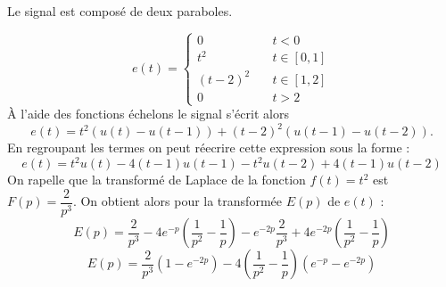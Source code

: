 Le signal est composé de deux paraboles. 
\begin{figure}[!h]
    \centering
    
\end{figure}
\[
e(t)=
\begin{cases}
    0&\quad t<0\\
    t^2&\quad t\in[0,1]\\
    (t-2)^2&\quad t\in[1,2]\\
    0&\quad t>2
\end{cases}
\]
\`A l'aide des fonctions échelons le signal s'écrit alors 
\[
    e(t)=t^2\left(u(t)-u(t-1)\right)+(t-2)^2\left(u(t-1)-u(t-2)\right).
\]
En regroupant les termes on peut réecrire cette expression sous la forme :
\[
    e(t)=t^2u(t)-4(t-1)u(t-1)-t^2u(t-2)+4(t-1)u(t-2)
\]
On rapelle que la transformé de Laplace de la fonction $f(t)=t^2$ 
est $F(p)=\dfrac{2}{p^3}$. On obtient alors pour la transformée 
$E(p)$ de $e(t)$ :
\[
    E(p)=\dfrac{2}{p^3}-4e^{-p}\left(\dfrac{1}{p^2}-\dfrac{1}{p}\right)
        -e^{-2p}\dfrac{2}{p^3}+4e^{-2p}\left(\dfrac{1}{p^2}-\dfrac{1}{p}\right)
\]
\[
    E(p)=\dfrac{2}{p^3}\left(1-e^{-2p}\right)
        -4\left(\dfrac{1}{p^2}-\dfrac{1}{p}\right)\left(e^{-p}-e^{-2p}\right)
\]


